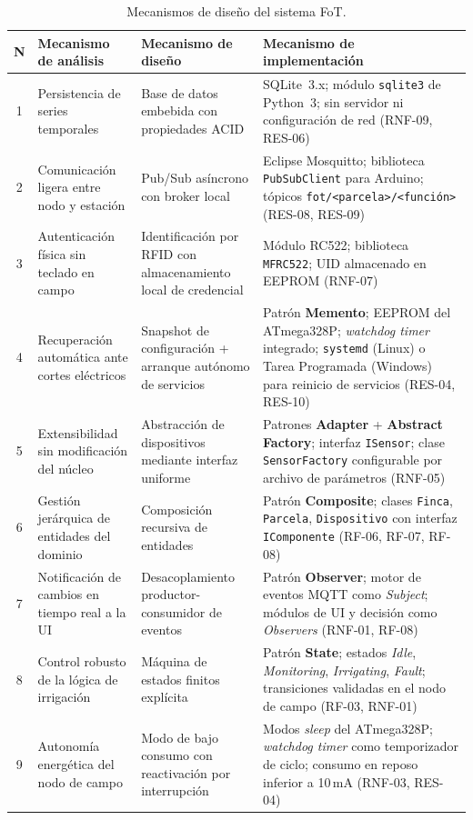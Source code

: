 \begin{table}[htbp]
\centering
\caption{Mecanismos de diseño del sistema FoT.}
\label{tab:mecanismos}
\small
\begin{tabular}{|c|p{3.2cm}|p{3.6cm}|p{4.8cm}|}
\hline
\textbf{N\raisebox{0.5ex}{\textdegree}} & \textbf{Mecanismo de análisis} & \textbf{Mecanismo de diseño}
    & \textbf{Mecanismo de implementación} \\
\hline
1 & Persistencia de series temporales
    & Base de datos embebida con propiedades ACID
    & SQLite~3.x; módulo \texttt{sqlite3} de Python~3; sin servidor
      ni configuración de red (RNF-09, RES-06) \\
\hline
2 & Comunicación ligera entre nodo y estación
    & Pub/Sub asíncrono con broker local
    & Eclipse Mosquitto; biblioteca \texttt{PubSubClient} para Arduino;
      tópicos \texttt{fot/<parcela>/<función>} (RES-08, RES-09) \\
\hline
3 & Autenticación física sin teclado en campo
    & Identificación por RFID con almacenamiento local de credencial
    & Módulo RC522; biblioteca \texttt{MFRC522}; UID almacenado
      en EEPROM (RNF-07) \\
\hline
4 & Recuperación automática ante cortes eléctricos
    & Snapshot de configuración + arranque autónomo de servicios
    & Patrón \textbf{Memento}; EEPROM del ATmega328P; \textit{watchdog timer}
      integrado; \texttt{systemd} (Linux) o Tarea Programada (Windows)
      para reinicio de servicios (RES-04, RES-10) \\
\hline
5 & Extensibilidad sin modificación del núcleo
    & Abstracción de dispositivos mediante interfaz uniforme
    & Patrones \textbf{Adapter} + \textbf{Abstract Factory};
      interfaz \texttt{ISensor}; clase \texttt{SensorFactory}
      configurable por archivo de parámetros (RNF-05) \\
\hline
6 & Gestión jerárquica de entidades del dominio
    & Composición recursiva de entidades
    & Patrón \textbf{Composite}; clases \texttt{Finca},
      \texttt{Parcela}, \texttt{Dispositivo} con interfaz
      \texttt{IComponente} (RF-06, RF-07, RF-08) \\
\hline
7 & Notificación de cambios en tiempo real a la UI
    & Desacoplamiento productor-consumidor de eventos
    & Patrón \textbf{Observer}; motor de eventos MQTT como
      \textit{Subject}; módulos de UI y decisión como
      \textit{Observers} (RNF-01, RF-08) \\
\hline
8 & Control robusto de la lógica de irrigación
    & Máquina de estados finitos explícita
    & Patrón \textbf{State}; estados \textit{Idle},
      \textit{Monitoring}, \textit{Irrigating}, \textit{Fault};
      transiciones validadas en el nodo de campo (RF-03, RNF-01) \\
\hline
9 & Autonomía energética del nodo de campo
    & Modo de bajo consumo con reactivación por interrupción
    & Modos \textit{sleep} del ATmega328P;
      \textit{watchdog timer} como temporizador de ciclo;
      consumo en reposo inferior a 10\,mA (RNF-03, RES-04) \\
\hline
\end{tabular}
\end{table}


